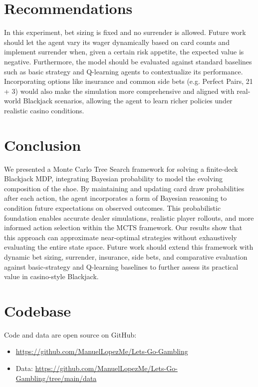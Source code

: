 \documentclass[12pt,a4paper]{cibb}
\begin{document}
\section{Recommendations}
In this experiment, bet sizing is fixed and no surrender is allowed. Future work should let the agent vary its wager dynamically based on card counts and implement surrender when, given a certain risk appetite, the expected value is negative. Furthermore, the model should be evaluated against standard baselines such as basic strategy and Q-learning agents to contextualize its performance. Incorporating options like insurance and common side bets (e.g. Perfect Pairs, 21 + 3) would also make the simulation more comprehensive and aligned with real-world Blackjack scenarios, allowing the agent to learn richer policies under realistic casino conditions.

\section{Conclusion}

We presented a Monte Carlo Tree Search framework for solving a finite-deck Blackjack MDP, integrating Bayesian probability to model the evolving composition of the shoe. By maintaining and updating card draw probabilities after each action, the agent incorporates a form of Bayesian reasoning to condition future expectations on observed outcomes. This probabilistic foundation enables accurate dealer simulations, realistic player rollouts, and more informed action selection within the MCTS framework. Our results show that this approach can approximate near-optimal strategies without exhaustively evaluating the entire state space. Future work should extend this framework with dynamic bet sizing, surrender, insurance, side bets, and comparative evaluation against basic-strategy and Q-learning baselines to further assess its practical value in casino-style Blackjack.



\appendix


\section{Codebase}
\begingroup
\sloppy
Code and data are open source on GitHub:
\begin{itemize}[leftmargin=*]
  \item \url{https://github.com/ManuelLopezMe/Lets-Go-Gambling}  
  \item Data: \url{https://github.com/ManuelLopezMe/Lets-Go-Gambling/tree/main/data}
\end{itemize}
\endgroup
\end{document}
